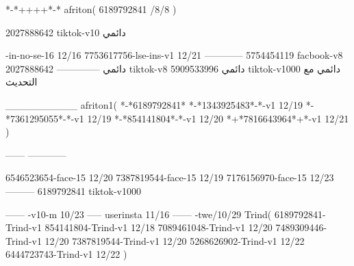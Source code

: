 *-*++++*-*
afriton(
6189792841 /8/8
)

2027888642 tiktok-v10
دائمي

-in-no-se-16 12/16
7753617756-lse-ins-v1 12/21
------------
5754454119 facbook-v8
دائمي
--------------
2027888642 tiktok-v8
دائمي
5909533996 tiktok-v1000
دائمي مع التحديث

__________
afriton1(
*-*6189792841*
*-*1343925483*-*-v1 12/19
*-*7361295055*-*-v1 12/19
*-*854141804*-*-v1 12/20
*+*7816643964*+*-v1 12/21
)

------
------------


6546523654-face-15 12/20
7387819544-face-15 12/19
7176156970-face-15 12/23
---------
6189792841 tiktok-v1000
 
------
-v10-m 10/23
-----
userinsta 11/16
------
-twe/10/29
Trind(
6189792841-Trind-v1 
854141804-Trind-v1 12/18
7089461048-Trind-v1 12/20
7489309446-Trind-v1 12/20
7387819544-Trind-v1 12/20
5268626902-Trind-v1 12/22
6444723743-Trind-v1 12/22
)
